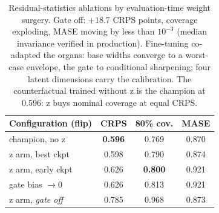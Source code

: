 \begin{table}[!t]
\centering
\scriptsize
\begin{tabular}{lccc}
\toprule
Configuration (flip) & CRPS & 80\% cov. & MASE \\
\midrule
champion, no z & \textbf{0.596} & 0.769 & 0.870 \\
z arm, best ckpt & 0.598 & 0.790 & 0.874 \\
z arm, early ckpt & 0.626 & \textbf{0.800} & 0.921 \\
\quad gate bias $\to 0$ & 0.626 & 0.813 & 0.921 \\
z arm, \emph{gate off} & 0.785 & 0.968 & 0.873 \\
\bottomrule
\end{tabular}
\caption{Residual-statistics ablations by evaluation-time weight
surgery. Gate off: $+18.7$ CRPS points, coverage exploding, MASE moving
by less than $10^{-3}$ (median invariance verified in production).
Fine-tuning co-adapted the organs: base widths converge to a worst-case
envelope, the gate to conditional sharpening; four latent dimensions
carry the calibration. The counterfactual trained without z is the
champion at 0.596: z buys nominal coverage at equal CRPS.}
\label{tab:esjepa}
\end{table}
